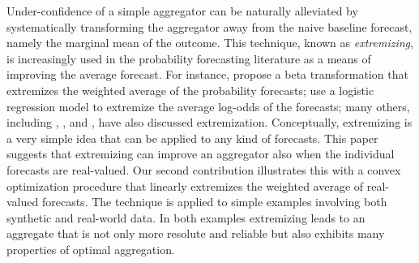 \documentclass[11pt]{article}
\theoremstyle{definition}
\theoremstyle{definition}
\begin{document}
Under-confidence of a simple aggregator can be naturally alleviated by systematically transforming the aggregator away from the naive baseline forecast, namely the marginal mean of the outcome. 
This technique, known as \textit{extremizing}, is increasingly used in the probability forecasting literature as a means of
improving the average forecast. For instance, \cite{Ranjan08} propose a beta transformation that extremizes the weighted average of
  the probability forecasts; \cite{satopaa} use a logistic regression model to extremize the average log-odds of the
  forecasts; many others, including \cite{baron2014two}, \cite{mellers2014psychological}, and \cite{shlomi2010subjective}, have also discussed extremization. 
Conceptually, extremizing is a very simple idea that can be applied to any kind of forecasts.
 This paper suggests that extremizing can improve an aggregator also when the individual forecasts are real-valued. 
Our second contribution illustrates this with a convex optimization procedure that linearly extremizes the weighted average of real-valued forecasts. The technique is applied to simple examples involving both synthetic and real-world data. In both examples extremizing leads to an aggregate that is not only more resolute and reliable but also exhibits many properties of optimal aggregation.

\end{document}
